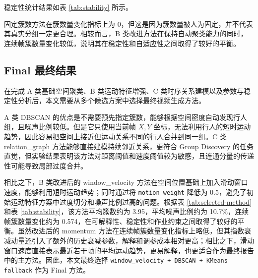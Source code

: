 \documentclass[UTF8,a4paper,12pt]{ctexart}
\begin{document}
稳定性统计结果如表 \ref{tab:stability} 所示。

\begin{table}[H]
\centering
\caption{代表方法连续帧稳定性对比}
\label{tab:stability}
\end{table}

固定簇数方法在簇数量变化指标上为 0，但这是因为簇数量被人为固定，并不代表其真实分组一定更合理。相较而言，B 类改进方法在保持自动聚类能力的同时，连续帧簇数量变化较低，说明其在稳定性和自适应性之间取得了较好的平衡。

\subsection{Final 最终结果}

在完成 A 类基础空间聚类、B 类运动特征增强、C 类时序关系建模以及参数与稳定性分析后，本文需要从多个候选方案中选择最终视频生成方法。

A 类 DBSCAN 的优点是不需要预先指定簇数，能够根据空间密度自动发现行人组，且噪声比例较低。但是它只使用当前帧 $X,Y$ 坐标，无法利用行人的短时运动趋势，因此容易把空间上接近但运动关系不同的行人合并到同一组。C 类 relation\_graph 方法能够直接建模持续邻近关系，更符合 Group Discovery 的任务直觉，但实验结果表明该方法对距离阈值和速度阈值较为敏感，且连通分量的传递性可能导致局部过度合并。

相比之下，B 类改进后的 window\_velocity 方法在空间位置基础上加入滑动窗口速度，能够利用短时运动趋势；同时通过将 \texttt{motion\_weight} 降低为 0.5，避免了初始运动特征方案中过度切分和噪声比例过高的问题。根据表 \ref{tab:selected-method} 和表 \ref{tab:stability}，该方法平均簇数约为 3.95，平均噪声比例约为 10.7\%，连续帧簇数量变化约为 0.574，在可解释性、稳定性和作业约束之间取得了较好的平衡。虽然改进后的 momentum 方法在连续帧簇数量变化指标上略低，但其指数衰减动量还引入了额外的历史衰减参数，解释和调参成本相对更高；相比之下，滑动窗口速度直接表示最近若干帧的平均运动趋势，更易解释，也更适合作为最终报告中的主方法。因此，本文最终选择 \texttt{window\_velocity + DBSCAN + KMeans fallback} 作为 Final 方法。
\end{document}
